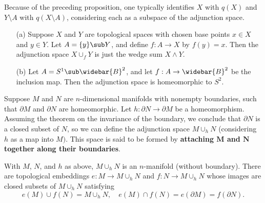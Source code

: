 Because of the preceding proposition, one typically identifies $X$ with $q(X)$ and $Y\setminus A$ with $q(X\setminus A)$, considering each as a subspace of the adjunction space.
\begin{example}
\mbox{}
\begin{itemize}
\item[(a)] Suppose $X$ and $Y$ are topological spaces with chosen base points $x\in X$ and $y\in Y$. Let $A=\{y\}\sub Y$, and define $f:A\to X$ by $f(y)=x$. Then the adjunction space $X\cup_f Y$ is just the wedge sum $X\wedge Y$.
\item[(b)] Let $A=S^1\sub\widebar{B}^2$, and let $f:A\to\widebar{B}^2$ be the inclusion map. Then the adjunction space is homeomorphic to $S^2$.
\end{itemize}
\end{example}
Suppose $M$ and $N$ are $n$-dimensional manifolds with nonempty boundaries, such that $\partial M$ and $\partial N$ are homeomorphic. Let $h:\partial N\to \partial M$ be a homeomorphism. Assuming the theorem on the invariance of the boundary, we conclude that $\partial N$ is a closed subset of $N$, so we can define the adjunction space $M\cup_{h}N$ (considering $h$ as a map into $M)$. This space is said to be formed by \textbf{attaching $\bm{M}$ and $\bm{N}$ together along their boundaries}.
\begin{theorem}\label{attach manifold with boundary}
With $M$, $N$, and $h$ as above, $M\cup_h N$ is an $n$-manifold (without boundary). There are topological embeddings $e:M\to M\cup_{h}N$ and $f:N\to M\cup_{h}N$ whose images are closed subsets of $M\cup_{h}N$ satisfying
\[e(M)\cup f(N)=M\cup_{h}N,\quad e(M)\cap f(N)=e(\partial M)=f(\partial N).\]
\end{theorem}
